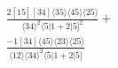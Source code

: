 \documentclass[varwidth, border=5pt]{standalone}
\begin{document}
\begin{my}
$\begin{gathered}
\scriptscriptstyle\frac{2[15][34]⟨35⟩⟨45⟩⟨25⟩}{⟨34⟩^2⟨5|1+2|5]^2}+\\
\scriptscriptstyle\frac{-1[34]⟨45⟩⟨23⟩⟨25⟩}{⟨12⟩⟨34⟩^2⟨5|1+2|5]}\phantom{+}
\end{gathered}$
\end{my}
\end{document}
